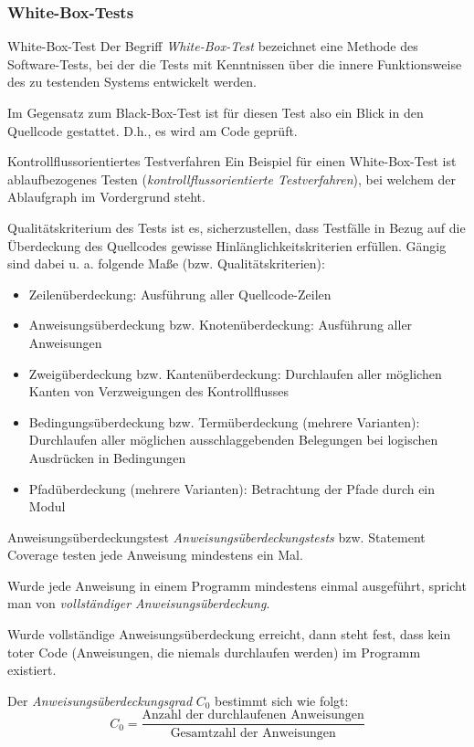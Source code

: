 \subsubsection{White-Box-Tests}

\begin{defi}{White-Box-Test}
    Der Begriff \emph{White-Box-Test} bezeichnet eine Methode des Software-Tests, bei der die Tests mit Kenntnissen über die innere Funktionsweise des zu testenden Systems entwickelt werden.

    Im Gegensatz zum Black-Box-Test ist für diesen Test also ein Blick in den Quellcode gestattet.
    D.h., es wird am Code geprüft.
\end{defi}

\begin{defi}{Kontrollflussorientiertes Testverfahren}
    Ein Beispiel für einen White-Box-Test ist ablaufbezogenes Testen (\emph{kontrollflussorientierte Testverfahren}), bei welchem der Ablaufgraph im Vordergrund steht.

    Qualitätskriterium des Tests ist es, sicherzustellen, dass Testfälle in Bezug auf die Überdeckung des Quellcodes gewisse Hinlänglichkeitskriterien erfüllen.
    Gängig sind dabei u. a. folgende Maße (bzw. Qualitätskriterien):
    \begin{itemize}
        \item Zeilenüberdeckung: Ausführung aller Quellcode-Zeilen
        \item Anweisungsüberdeckung bzw. Knotenüberdeckung: Ausführung aller Anweisungen
        \item Zweigüberdeckung bzw. Kantenüberdeckung: Durchlaufen aller möglichen Kanten von Verzweigungen des Kontrollflusses
        \item Bedingungsüberdeckung bzw. Termüberdeckung (mehrere Varianten): Durchlaufen aller möglichen ausschlaggebenden Belegungen bei logischen Ausdrücken in Bedingungen
        \item Pfadüberdeckung (mehrere Varianten): Betrachtung der Pfade durch ein Modul
    \end{itemize}
\end{defi}

\begin{defi}{Anweisungsüberdeckungstest}
    \emph{Anweisungsüberdeckungstests} bzw. Statement Coverage testen jede Anweisung mindestens ein Mal.

    Wurde jede Anweisung in einem Programm mindestens einmal ausgeführt, spricht man von \emph{vollständiger Anweisungsüberdeckung}.

    Wurde vollständige Anweisungsüberdeckung erreicht, dann steht fest, dass kein toter Code (Anweisungen, die niemals durchlaufen werden) im Programm existiert.

    Der \emph{Anweisungsüberdeckungsgrad} $C_0$ bestimmt sich wie folgt:
    \[
        C_0 = \frac{\text{Anzahl der durchlaufenen Anweisungen}}{\text{Gesamtzahl der Anweisungen}}
    \]
\end{defi}

